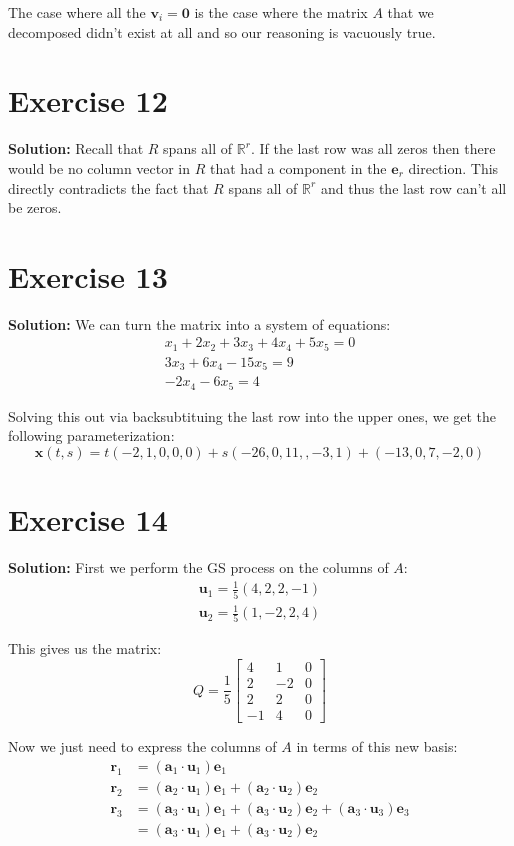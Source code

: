 \documentclass{article}
\newcommand{\R}{\mathbb R}
\newcommand{\mbf}[1]{\mathbf #1}
\begin{document}
The case where all the $\mbf v_i=\mbf 0$ is the case where the matrix $A$ that we decomposed didn't exist at all and so our reasoning is vacuously true.

\section*{Exercise 12}
\textbf{Solution:} Recall that $R$ spans all of $\R^r$. If the last row was all zeros then there would be no column vector in $R$ that had a component in the $\mbf e_r$ direction. This directly contradicts the fact that $R$ spans all of $\R^r$ and thus the last row can't all be zeros.

\section*{Exercise 13}
\textbf{Solution:} We can turn the matrix into a system of equations:
\begin{align*}
  x_1+2x_2+3x_3+4x_4+5x_5=0\\
  3x_3+6x_4-15x_5=9\\
  -2x_4-6x_5=4
\end{align*}

Solving this out via backsubtituing the last row into the upper ones, we get the following parameterization:
$$\mbf x(t,s)=t(-2,1,0,0,0)+s(-26,0,11,,-3,1)+(-13,0,7,-2,0)$$

\section*{Exercise 14}
\textbf{Solution:} First we perform the GS process on the columns of $A$:
\begin{align*}
  \mbf u_1=\frac{1}{5}(4,2,2,-1)\\
  \mbf u_2=\frac{1}{5}(1,-2,2,4)
\end{align*}

This gives us the matrix:
$$Q=\frac{1}{5}\begin{bmatrix}
    4 & 1 & 0\\
    2 & -2 & 0\\
    2 & 2 & 0\\
    -1 & 4 & 0
\end{bmatrix}$$

Now we just need to express the columns of $A$ in terms of this new basis:
\begin{align*}
  \mbf r_1&=(\mbf a_1\cdot \mbf u_1)\mbf e_1\\
  \mbf r_2&=(\mbf a_2\cdot \mbf u_1)\mbf e_1+(\mbf a_2\cdot \mbf u_2)\mbf e_2\\
  \mbf r_3&=(\mbf a_3\cdot \mbf u_1)\mbf e_1+(\mbf a_3\cdot \mbf u_2)\mbf e_2+(\mbf a_3\cdot \mbf u_3)\mbf e_3\\
  &=(\mbf a_3\cdot \mbf u_1)\mbf e_1+(\mbf a_3\cdot \mbf u_2)\mbf e_2
\end{align*}
\end{document}
